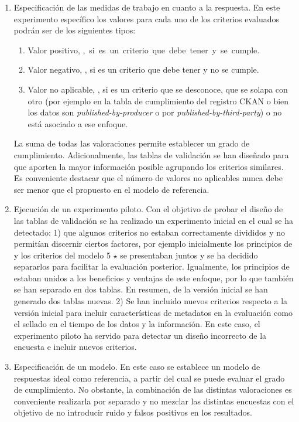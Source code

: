 \begin{enumerate}
 \item Especificación de las medidas de trabajo en cuanto a la respuesta. En este experimento específico los valores 
para cada uno de los criterios evaluados podrán ser de los siguientes tipos:
\begin{enumerate}
 \item Valor positivo, \si, si es un criterio que debe tener y se cumple.
 \item Valor negativo, \no, si es un criterio que debe tener y no se cumple.
 \item Valor no aplicable, \na, si es un criterio que se desconoce, que se solapa con otro (por ejemplo 
en la tabla de cumplimiento del registro \gls{CKAN} o bien los datos son \textit{published-by-producer} o 
por \textit{published-by-third-party}) o no está asociado a ese enfoque.
\end{enumerate}

La suma de todas las valoraciones permite establecer un grado de cumplimiento. Adicionalmente, las tablas de 
validación se han diseñado para que aporten la mayor información posible agrupando los criterios similares. Es conveniente 
destacar que el número de valores no aplicables nunca debe ser menor que el propuesto en el modelo de referencia.

 \item Ejecución de un experimento piloto. Con el objetivo de probar el diseño de las tablas de validación 
se ha realizado un experimento inicial en el cual se ha detectado: 1) que algunos criterios no estaban 
correctamente divididos y no permitían discernir ciertos factores, por ejemplo inicialmente los principios 
de \linkeddata y los criterios del modelo 5 $\star$ se presentaban juntos y se ha decidido separarlos para facilitar 
la evaluación posterior. Igualmente, los principios de \opendata estaban unidos a los beneficios y ventajas de este enfoque, por lo que también 
se han separado en dos tablas. En resumen, de la versión inicial se han generado dos tablas nuevas. 2) Se han incluido nuevos criterios respecto a la versión inicial para incluir características de metadatos 
en la evaluación como el sellado en el tiempo de los datos y la información. En este caso, el experimento piloto ha servido 
para detectar un diseño incorrecto de la encuesta e incluir nuevos criterios.

 \item Especificación de un modelo. En este caso se establece un modelo de respuestas ideal como referencia, a partir del 
cual se puede evaluar el grado de cumplimiento. No obstante, la combinación de las distintas valoraciones es conveniente 
realizarla por separado y no mezclar las distintas encuestas con el objetivo de no introducir ruido y falsos positivos 
en los resultados.


\end{enumerate}
